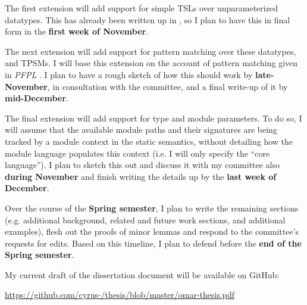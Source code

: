 The first extension will add support for simple TSLs over unparameterized datatypes. This has already been written up in \cite{TSLs}, so I plan to have this in final form in the \textbf{first week of November}.

The next extension will add support for pattern matching over these datatypes, and TPSMs. I will base this extension on the account of pattern matching given in \emph{PFPL} \cite{pfpl}. I plan to have a rough sketch of how this should work by \textbf{late-November}, in consultation with the committee, and a final write-up of it by \textbf{mid-December}.

The final extension will add support for type and module parameters. To do so, I will assume that the available module paths and their signatures are being tracked by a module context in the static semantics, without detailing how the module language populates this context (i.e. I will only specify the ``core language''). I plan to sketch this out and discuss it with my committee also \textbf{during November} and finish writing the details up by the \textbf{last week of December}.

Over the course of the \textbf{Spring semester}, I plan to write the remaining sections (e.g. additional background, related and future work sections, and additional examples), flesh out the proofs of minor lemmas and respond to the committee's requests for edits. Based on this timeline, I plan to defend before the \textbf{end of the Spring semester}.

My current draft of the dissertation document will be available on GitHub:

\url{https://github.com/cyrus-/thesis/blob/master/omar-thesis.pdf}



